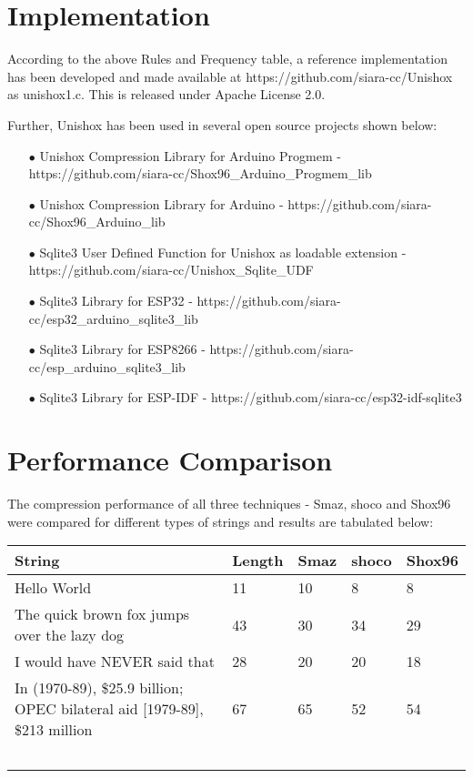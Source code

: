 \documentclass[]{article}
\begin{document}
\section{Implementation}

According to the above Rules and Frequency table, a reference implementation has been developed and made available at https://github.com/siara-cc/Unishox as unishox1.c.  This is released under Apache License 2.0.

Further, Unishox has been used in several open source projects shown below:

\begin{itemize}
	\item[$\bullet$] Unishox Compression Library for Arduino Progmem - https://github.com/siara-cc/Shox96\_Arduino\_Progmem\_lib
	\item[$\bullet$] Unishox Compression Library for Arduino - https://github.com/siara-cc/Shox96\_Arduino\_lib
	\item[$\bullet$] Sqlite3 User Defined Function for Unishox as loadable extension - https://github.com/siara-cc/Unishox\_Sqlite\_UDF
	\item[$\bullet$] Sqlite3 Library for ESP32 - https://github.com/siara-cc/esp32\_arduino\_sqlite3\_lib
	\item[$\bullet$] Sqlite3 Library for ESP8266 - https://github.com/siara-cc/esp\_arduino\_sqlite3\_lib
	\item[$\bullet$] Sqlite3 Library for ESP-IDF - https://github.com/siara-cc/esp32-idf-sqlite3
\end{itemize}

\section{Performance Comparison}

The compression performance of all three techniques - Smaz, shoco and Shox96 were compared for different types of strings and results are tabulated below:

\begin{center}
\begin{tabular}{ | p{} | p{} | p{} | p{} | p{} |} \hline
﻿\textbf{String} & ﻿\textbf{Length} & ﻿\textbf{Smaz} & ﻿\textbf{shoco} & ﻿\textbf{Shox96} \\ \hline
Hello World & 11 & 10 & 8 & 8 \\ \hline
The quick brown fox jumps over the lazy dog & 43 & 30 & 34 & 29 \\ \hline
I would have NEVER said that & 28 & 20 & 20 & 18 \\ \hline
In (1970-89), \$25.9 billion; OPEC bilateral aid [1979-89], \$213 million & 67 & 65 & 52 & 54 \\ \hline
	﻿\end{tabular}
\end{center}
\end{document}
